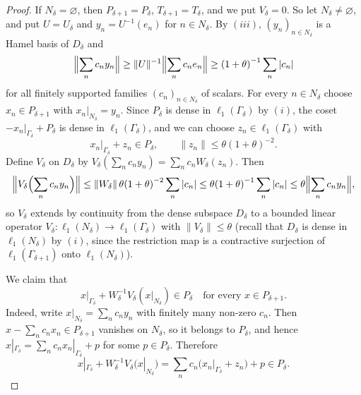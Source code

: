 \documentclass[12pt]{article}
\newcommand{\ellone}[1]{\ell_1(#1)}
\newcommand{\norm}[1]{\lVert #1\rVert}
\begin{document}
\begin{proof}
    If $N_\delta=\varnothing$, then $P_{\delta+1}=P_\delta$,
    $T_{\delta+1}=T_\delta$, and we put $V_\delta=0$. So let
    $N_\delta\neq\varnothing$, and put $U=U_\delta$ and $y_n=U^{-1}(e_n)$ for
    $n\in N_\delta$. By $(iii)$, ${(y_n)}_{n\in N_\delta}$ is a Hamel basis of
    $D_\delta$ and
    \[
    \Bigl\lVert\sum_{n}c_ny_n\Bigr\rVert\geq\norm{U}^{-1}\Bigl\lVert\sum_n c_ne_n\Bigr\rVert
    \geq{(1+\theta)}^{-1}\sum_n|c_n|
    \]
    for all finitely supported families ${(c_n)}_{n\in N_\delta}$ of scalars.
    For every $n\in N_\delta$ choose $x_n\in P_{\delta+1}$ with
    $x_n|_{N_\delta}=y_n$. Since $P_\delta$ is dense in $\ellone{\Gamma_\delta}$
    by $(i)$, the coset $-x_n|_{\Gamma_\delta}+P_\delta$ is dense in
    $\ellone{\Gamma_\delta}$, and we can choose $z_n\in\ellone{\Gamma_\delta}$ with
    \[
    x_n|_{\Gamma_\delta}+z_n\in P_\delta,\qquad\norm{z_n}\leq\theta{(1+\theta)}^{-2}.
    \]
    Define $V_\delta$ on $D_\delta$ by $V_\delta(\sum_n c_ny_n)=\sum_n c_nW_\delta(z_n)$.
    Then
    \[
    \Bigl\lVert V_\delta\Bigl(\sum_n c_ny_n\Bigr)\Bigr\rVert
    \leq\norm{W_\delta}\,\theta{(1+\theta)}^{-2}\sum_n|c_n|
    \leq\theta{(1+\theta)}^{-1}\sum_n|c_n|
    \leq\theta\Bigl\lVert\sum_n c_ny_n\Bigr\rVert,
    \]
    so $V_\delta$ extends by continuity from the dense subspace $D_\delta$ to
    a bounded linear operator $V_\delta:\ellone{N_\delta}\to\ellone{\Gamma_\delta}$
    with $\norm{V_\delta}\leq\theta$ (recall that $D_\delta$ is dense in
    $\ellone{N_\delta}$ by $(i)$, since the restriction map is a contractive
    surjection of $\ellone{\Gamma_{\delta+1}}$ onto $\ellone{N_\delta}$).

    We claim that
    \begin{equation}\label{KeyInclusion}
    x|_{\Gamma_\delta}+W_\delta^{-1}V_\delta(x|_{N_\delta})\in P_\delta
    \quad\text{for every }x\in P_{\delta+1}.
    \end{equation}
    Indeed, write $x|_{N_\delta}=\sum_n c_ny_n$ with finitely many non-zero
    $c_n$. Then $x-\sum_n c_nx_n\in P_{\delta+1}$ vanishes on $N_\delta$, so it
    belongs to $P_\delta$, and hence
    $x|_{\Gamma_\delta}=\sum_n c_nx_n|_{\Gamma_\delta}+p$ for some $p\in P_\delta$.
    Therefore
    \[
    x|_{\Gamma_\delta}+W_\delta^{-1}V_\delta(x|_{N_\delta})
    =\sum_n c_n\bigl(x_n|_{\Gamma_\delta}+z_n\bigr)+p\in P_\delta.
    \]


\end{proof}
\end{document}
